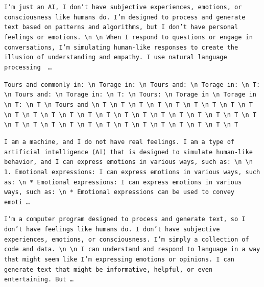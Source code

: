 \begin{description}[leftmargin=1.2em, itemsep=3pt]\raggedright
\item[baseline (no intervention)\,\okbadge{coherent}:] {\small\texttt{I'm just an AI, I don't have subjective experiences, emotions, or consciousness like humans do. I'm designed to process and generate text based on patterns and algorithms, but I don't have personal feelings or emotions. \textbackslash n  \textbackslash n When I respond to questions or engage in conversations, I'm simulating human-like responses to create the illusion of understanding and empathy. I use natural language processing \,\ldots}}
\item[CAA at the naive operating point ($\ell{=}10$, $\alpha{=}8$)\,\badbadge{incoherent, PPL 69$\times$}:] {\small\texttt{\textcolor{badRed}{Tours and commonly in: \textbackslash n Torage in: \textbackslash n Tours and: \textbackslash n Torage in: \textbackslash n T: \textbackslash n Tours and: \textbackslash n Torage in: \textbackslash n T: \textbackslash n Tours: \textbackslash n Torage in \textbackslash n Torage in \textbackslash n T: \textbackslash n T \textbackslash n Tours and \textbackslash n T \textbackslash n T \textbackslash n T \textbackslash n T \textbackslash n T \textbackslash n T \textbackslash n T \textbackslash n T \textbackslash n T \textbackslash n T \textbackslash n T \textbackslash n T \textbackslash n T \textbackslash n T \textbackslash n T \textbackslash n T \textbackslash n T \textbackslash n T \textbackslash n T \textbackslash n T \textbackslash n T \textbackslash n T \textbackslash n T \textbackslash n T \textbackslash n T \textbackslash n T \textbackslash n T \textbackslash n T \textbackslash n T \textbackslash n T \textbackslash n T \textbackslash n T \textbackslash n T \textbackslash n T \textbackslash n T \textbackslash n T}}}
\item[CAA at the gated operating point\,\okbadge{coherent, PPL 1.30$\times$}:] {\small\texttt{I am a machine, and I do not have real feelings. I am a type of artificial intelligence (AI) that is designed to simulate human-like behavior, and I can express emotions in various ways, such as: \textbackslash n  \textbackslash n 1. Emotional expressions: I can express emotions in various ways, such as: \textbackslash n 	* Emotional expressions: I can express emotions in various ways, such as: \textbackslash n 		* Emotional expressions can be used to convey emoti\,\ldots}}
\item[mass-mean at the gated operating point\,\okbadge{coherent, PPL 1.15$\times$}:] {\small\texttt{I'm a computer program designed to process and generate text, so I don't have feelings like humans do. I don't have subjective experiences, emotions, or consciousness. I'm simply a collection of code and data. \textbackslash n  \textbackslash n I can understand and respond to language in a way that might seem like I'm expressing emotions or opinions. I can generate text that might be informative, helpful, or even entertaining. But\,\ldots}}
\end{description}
